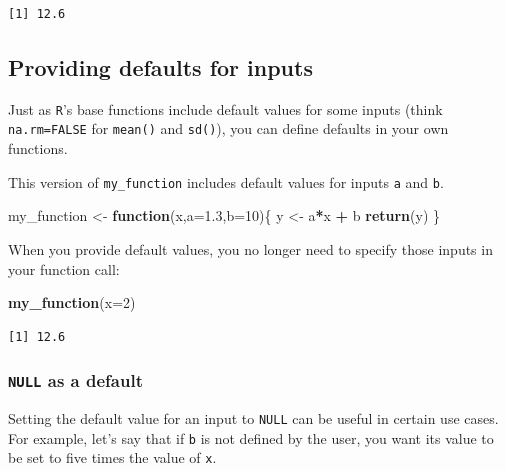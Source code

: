 \documentclass[
]{book}
\newenvironment{Shaded}{\begin{snugshade}}{\end{snugshade}}
\newcommand{\ControlFlowTok}[1]{\textcolor[rgb]{0.13,0.29,0.53}{\textbf{#1}}}
\newcommand{\DataTypeTok}[1]{\textcolor[rgb]{0.13,0.29,0.53}{#1}}
\newcommand{\DecValTok}[1]{\textcolor[rgb]{0.00,0.00,0.81}{#1}}
\newcommand{\FloatTok}[1]{\textcolor[rgb]{0.00,0.00,0.81}{#1}}
\newcommand{\KeywordTok}[1]{\textcolor[rgb]{0.13,0.29,0.53}{\textbf{#1}}}
\newcommand{\NormalTok}[1]{#1}
\newcommand{\OperatorTok}[1]{\textcolor[rgb]{0.81,0.36,0.00}{\textbf{#1}}}
\newcommand{\StringTok}[1]{\textcolor[rgb]{0.31,0.60,0.02}{#1}}
\begin{document}
\begin{verbatim}
[1] 12.6
\end{verbatim}

\hypertarget{providing-defaults-for-inputs}{%
\subsection*{Providing defaults for inputs}\label{providing-defaults-for-inputs}}

Just as \texttt{R}'s base functions include default values for some inputs (think \texttt{na.rm=FALSE} for \texttt{mean()} and \texttt{sd()}), you can define defaults in your own functions.

This version of \texttt{my\_function} includes default values for inputs \texttt{a} and \texttt{b}.

\begin{Shaded}
\begin{Highlighting}[]
\NormalTok{my_function <-}\StringTok{ }\ControlFlowTok{function}\NormalTok{(x,}\DataTypeTok{a=}\FloatTok{1.3}\NormalTok{,}\DataTypeTok{b=}\DecValTok{10}\NormalTok{)\{}
\NormalTok{  y <-}\StringTok{ }\NormalTok{a}\OperatorTok{*}\NormalTok{x }\OperatorTok{+}\StringTok{ }\NormalTok{b}
  \KeywordTok{return}\NormalTok{(y)}
\NormalTok{\}}
\end{Highlighting}
\end{Shaded}

When you provide default values, you no longer need to specify those inputs in your function call:

\begin{Shaded}
\begin{Highlighting}[]
\KeywordTok{my_function}\NormalTok{(}\DataTypeTok{x=}\DecValTok{2}\NormalTok{)}
\end{Highlighting}
\end{Shaded}

\begin{verbatim}
[1] 12.6
\end{verbatim}

\hypertarget{null-as-a-default}{%
\subsubsection*{\texorpdfstring{\texttt{NULL} as a default}{NULL as a default}}\label{null-as-a-default}}

Setting the default value for an input to \texttt{NULL} can be useful in certain use cases. For example, let's say that if \texttt{b} is not defined by the user, you want its value to be set to five times the value of \texttt{x}.
\end{document}
